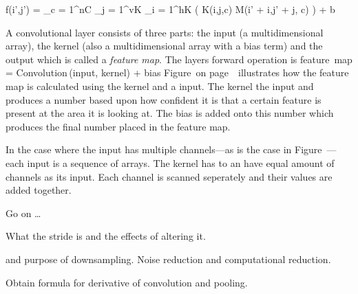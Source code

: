 \startplaceformula
\startformula
f(i',j') = \sum_{c = 1}^{nC} \sum_{j = 1}^{vK} \sum_{i = 1}^{hK} \Bigl( K(i,j,c) \cdot M(i' + i,j' + j, c) \Bigr) + b
\stopformula
\stopplaceformula


A convolutional layer consists of three parts: the input (a multidimensional array), the kernel (also a multidimensional array with a bias term) and the output which is called a {\em feature map}.
The layers forward operation is
\startformula
{\rm feature\ map} = {\rm Convolution}\,({\rm input}, {\rm kernel}) + {\rm bias}
\stopformula
Figure~ on page~ illustrates how the feature map is calculated using the kernel and a input.
The kernel  the input and produces a number based upon how confident it is that a certain feature is present at the area it is looking at.
The bias is added onto this number which produces the final number placed in the feature map.

\startplacefigure[reference=conv-operation,
                   title={The basic forward operation of a convolutional layer},
                   location=top]
{}{}
{}{}
{}{}
{}{}
{}{}
{}{}
{}{}
{}{}
\stopcombination
\stopplacefigure



In the case where the input has multiple channels---as is the case in Figure~---each input is a sequence of arrays.
The kernel has to an have equal amount of channels as its input.
Each channel is scanned seperately and their values are added together.


\stopsubsection

Go on \dots

\startsubsection[title=Multiple channels]
\stopsubsection

\startsubsubsection[title=Altering the stride]
What the stride is and the effects of altering it.
\stopsubsubsection

\startsubsubsection[title=Zero padding]
\stopsubsubsection

 and purpose of downsampling.
Noise reduction and computational reduction.
\stopsubsection

\startsubsection[title=Backward Propagation]
Obtain formula for derivative of convolution and pooling.
\stopsubsection
\stopsection